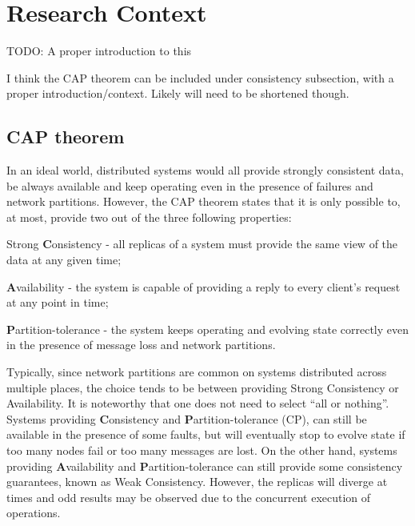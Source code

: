 
%

\chapter{Research Context}

TODO: A proper introduction to this

I think the CAP theorem can be included under consistency subsection, with a proper introduction/context. Likely will need to be shortened though.

\section{CAP theorem}

In an ideal world, distributed systems would all provide strongly consistent data, be always available and keep operating even in the presence of failures and network partitions.
However, the CAP theorem \cite{cap} states that it is only possible to, at most, provide two out of the three following properties:
\begin{enumerate*}[label=(\roman*)]
	\item Strong \textbf{C}onsistency - all replicas of a system must provide the same view of the data at any given time;
	\item \textbf{A}vailability - the system is capable of providing a reply to every client's request at any point in time;
	\item \textbf{P}artition-tolerance - the system keeps operating and evolving state correctly even in the presence of message loss and network partitions.
\end{enumerate*}

Typically, since network partitions are common on systems distributed across multiple places, the choice tends to be between providing Strong Consistency or Availability.
It is noteworthy that one does not need to select ``all or nothing''. 
Systems providing \textbf{C}onsistency and \textbf{P}artition-tolerance (CP), can still be available in the presence of some faults, but will eventually stop to evolve state if too many nodes fail or too many messages are lost.
On the other hand, systems providing \textbf{A}vailability and \textbf{P}artition-tolerance can still provide some consistency guarantees, known as Weak Consistency. However, the replicas will diverge at times and odd results may be observed due to the concurrent execution of operations.

